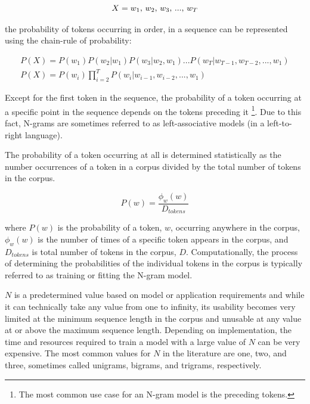 \documentclass[12pt]{article}
\begin{document}
\begin{equation}\label{eq:ngram_sequence}
    X = \mbox{$w_1$, $w_2$, $w_3$, ..., $w_T$}\\
\end{equation}

\noindent
the probability of tokens occurring in order, in a sequence can be represented using the chain-rule of probability:

\begin{equation}
    \begin{gathered}
        P(X) = P(w_1) P(w_2|w_1) P(w_3|w_2, w_1) ... P(w_T|w_{T-1}, w_{T-2}, ..., w_1)\\
        P(X) = P(w_i)\prod_{i=2}^{T} P(w_i|w_{i-1}, w_{i-2}, ..., w_1)
    \end{gathered}
\end{equation}

\noindent
Except for the first token in the sequence, the probability of a token occurring at a specific point in the sequence depends on the tokens preceding it
\footnote{The most common use case for an N-gram model is the preceding tokens.}. Due to this fact, N-grams are sometimes referred to as
left-associative models (in a left-to-right language).

The probability of a token occurring at all is determined statistically as the number occurrences of a token in a corpus divided by the total number
of tokens in the corpus.

\begin{equation}\label{eq:ngram_prob_wj}
    P(w) = \frac{\phi_w(w)}{D_{tokens}}
\end{equation}

\noindent
where $P(w)$ is the probability of a token, $w$, occurring anywhere in the corpus, $\phi_w(w)$ is the number of times of a specific
token appears in the corpus, and $D_{tokens}$ is total number of tokens in the corpus, $D$. Computationally, the process of determining the
probabilities of the individual tokens in the corpus is typically referred to as training or fitting the N-gram model.

$N$ is a predetermined value based on model or application requirements and while it can technically take any value from one to infinity, its
usability becomes very limited at the minimum sequence length in the corpus and unusable at any value at or above the maximum sequence length.
Depending on implementation, the time and resources required to train a model with a large value of $N$ can be very expensive. The most common values
for $N$ in the literature are one, two, and three, sometimes called unigrams, bigrams, and trigrams, respectively.
\end{document}
